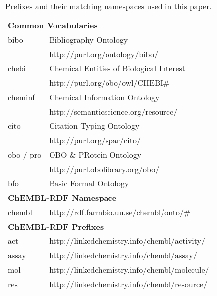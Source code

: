 \documentclass[10pt]{bmc_article}
\newenvironment{bmcformat}{\begin{raggedright}\baselineskip20pt\sloppy\setboolean{publ}{false}}{\end{raggedright}\baselineskip20pt\sloppy}
\begin{document}
\begin{bmcformat}
\newpage

\begin{table*}
\caption{Prefixes and their matching namespaces used in this paper.} \label{namespaces}
\begin{center}
\begin{tabular}{ll}
\hline
\multicolumn{2}{l}{\textbf{Common Vocabularies}} \\
bibo    & Bibliography Ontology~\cite{Giasson2011} \\
        & http://purl.org/ontology/bibo/ \\
chebi   & Chemical Entities of Biological Interest~\cite{DeMatos2010} \\
        & http://purl.org/obo/owl/CHEBI\# \\
cheminf & Chemical Information Ontology~\cite{Hastings2011} \\
        & http://semanticscience.org/resource/ \\
cito    & Citation Typing Ontology~\cite{Shotton2010} \\
        & http://purl.org/spar/cito/ \\
obo / pro & OBO \& PRotein Ontology~\cite{Sidhu2006} \\
          & http://purl.obolibrary.org/obo/ \\
bfo     & Basic Formal Ontology~\cite{Smith2004} \\

\multicolumn{2}{l}{\textbf{ChEMBL-RDF Namespace}} \\
chembl & http://rdf.farmbio.uu.se/chembl/onto/\# \\

\multicolumn{2}{l}{\textbf{ChEMBL-RDF Prefixes }}\\
act    & http://linkedchemistry.info/chembl/activity/ \\
assay  & http://linkedchemistry.info/chembl/assay/ \\
mol    & http://linkedchemistry.info/chembl/molecule/ \\
res    & http://linkedchemistry.info/chembl/resource/ \\
\hline
\end{tabular}
\end{center}
\end{table*}


\end{bmcformat}
\end{document}
